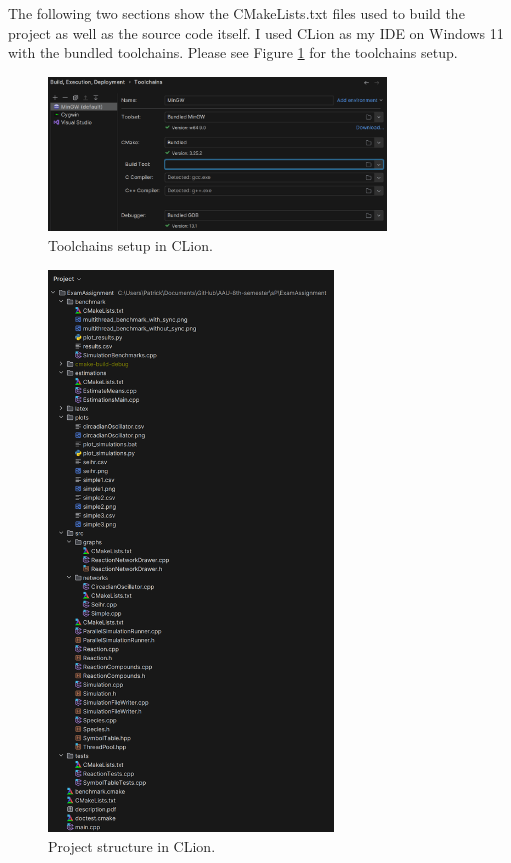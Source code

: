The following two sections show the CMakeLists.txt files used to build the project as well as the source code itself.
I used CLion as my IDE on Windows 11 with the bundled toolchains.
Please see Figure \ref{fig:toolchains} for the toolchains setup.

\begin{figure}[H]
  \centering
  \includegraphics[width=0.8\textwidth]{toolchains.png}
  \caption{Toolchains setup in CLion.}
  \label{fig:toolchains}
\end{figure}

\begin{figure}[H]
  \centering
  \includegraphics[width=0.675\textwidth]{project_structure.png}
  \caption{Project structure in CLion.}
  \label{fig:project_structure}
\end{figure}


